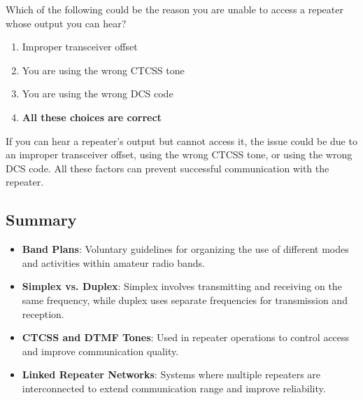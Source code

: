 
\begin{tcolorbox}[colback=gray!10!white,colframe=black!75!black,title={T2B04}]
    Which of the following could be the reason you are unable to access a repeater whose output you can hear?
    \begin{enumerate}[label=\Alph*),noitemsep]
        \item Improper transceiver offset
        \item You are using the wrong CTCSS tone
        \item You are using the wrong DCS code
        \item \textbf{All these choices are correct}
    \end{enumerate}
\end{tcolorbox}
If you can hear a repeater's output but cannot access it, the issue could be due to an improper transceiver offset, using the wrong CTCSS tone, or using the wrong DCS code. All these factors can prevent successful communication with the repeater.


\subsection*{Summary}
\begin{itemize}
    \item \textbf{Band Plans}: Voluntary guidelines for organizing the use of different modes and activities within amateur radio bands.
    \item \textbf{Simplex vs. Duplex}: Simplex involves transmitting and receiving on the same frequency, while duplex uses separate frequencies for transmission and reception.
    \item \textbf{CTCSS and DTMF Tones}: Used in repeater operations to control access and improve communication quality.
    \item \textbf{Linked Repeater Networks}: Systems where multiple repeaters are interconnected to extend communication range and improve reliability.
\end{itemize}
